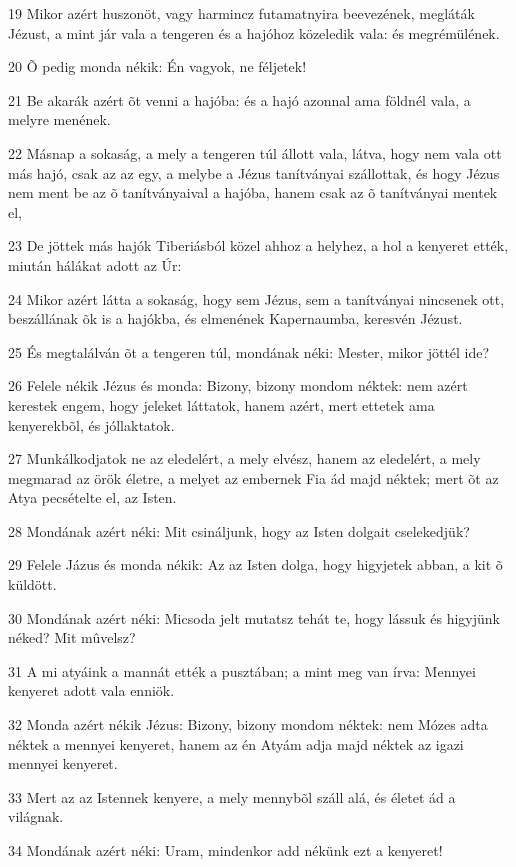 \par 19 Mikor azért huszonöt, vagy harmincz futamatnyira beevezének, megláták Jézust, a mint jár vala a tengeren és a hajóhoz közeledik vala: és megrémülének.
\par 20 Õ pedig monda nékik: Én vagyok, ne féljetek!
\par 21 Be akarák azért õt venni a hajóba: és a hajó azonnal ama földnél vala, a melyre menének.
\par 22 Másnap a sokaság, a mely a tengeren túl állott vala, látva, hogy nem vala ott más hajó, csak az az egy, a melybe a Jézus tanítványai szállottak, és hogy Jézus nem ment be az õ tanítványaival a hajóba, hanem csak az õ tanítványai mentek el,
\par 23 De jöttek más hajók Tiberiásból közel ahhoz a helyhez, a hol a kenyeret ették, miután hálákat adott az Úr:
\par 24 Mikor azért látta a sokaság, hogy sem Jézus, sem a tanítványai nincsenek ott, beszállának õk is a hajókba, és elmenének Kapernaumba, keresvén Jézust.
\par 25 És megtalálván õt a tengeren túl, mondának néki: Mester, mikor jöttél ide?
\par 26 Felele nékik Jézus és monda: Bizony, bizony mondom néktek: nem azért kerestek engem, hogy jeleket láttatok, hanem azért, mert ettetek ama kenyerekbõl, és jóllaktatok.
\par 27 Munkálkodjatok ne az eledelért, a mely elvész, hanem az eledelért, a mely megmarad az örök életre, a melyet az embernek Fia ád majd néktek; mert õt az Atya pecsételte el,  az Isten.
\par 28 Mondának azért néki: Mit csináljunk, hogy az Isten dolgait cselekedjük?
\par 29 Felele Jázus és monda nékik: Az az Isten dolga, hogy higyjetek abban, a kit õ küldött.
\par 30 Mondának azért néki: Micsoda jelt mutatsz tehát te, hogy lássuk és higyjünk néked? Mit mûvelsz?
\par 31 A mi atyáink a mannát ették a pusztában; a mint meg van írva: Mennyei kenyeret adott vala enniök.
\par 32 Monda azért nékik Jézus: Bizony, bizony mondom néktek: nem Mózes adta néktek a mennyei kenyeret, hanem az én Atyám adja majd néktek az igazi mennyei kenyeret.
\par 33 Mert az az Istennek kenyere, a mely mennybõl száll alá, és életet ád a világnak.
\par 34 Mondának azért néki: Uram, mindenkor add nékünk ezt a kenyeret!
